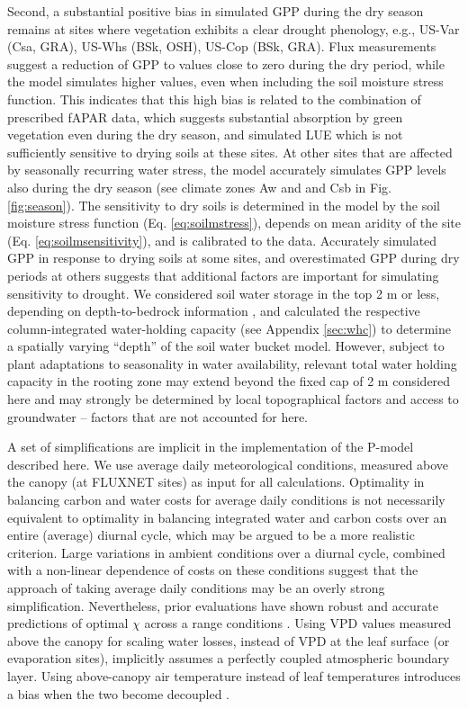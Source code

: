 \documentclass{myreport}
\begin{document}
Second, a substantial positive bias in simulated GPP during the dry season remains at sites where vegetation exhibits a clear drought phenology, e.g., US-Var (Csa, GRA), US-Whs (BSk, OSH), US-Cop (BSk, GRA). Flux measurements suggest a reduction of GPP to values close to zero during the dry period, while the model simulates higher values, even when including the soil moisture stress function. This indicates that this high bias is related to the combination of prescribed fAPAR data, which suggests substantial absorption by green vegetation even during the dry season, and simulated LUE which is not sufficiently sensitive to drying soils at these sites. At other sites that are affected by seasonally recurring water stress, the model accurately simulates GPP levels also during the dry season (see climate zones Aw and and Csb in Fig. \ref{fig:season}). The sensitivity to dry soils is determined in the model by the soil moisture stress function (Eq. \ref{eq:soilmstress}), depends on mean aridity of the site (Eq. \ref{eq:soilmsensitivity}), and is calibrated to the data. Accurately simulated GPP in response to drying soils at some sites, and overestimated GPP during dry periods at others suggests that additional factors are important for simulating sensitivity to drought. We considered soil water storage in the top 2 m or less, depending on depth-to-bedrock information \citep{Hengl2014-jm}, and calculated the respective column-integrated water-holding capacity (see Appendix \ref{sec:whc}) to determine a spatially varying ``depth'' of the soil water bucket model. However, subject to plant adaptations to seasonality in water availability, relevant total water holding capacity in the rooting zone may extend beyond the fixed cap of 2 m considered here \citep{yang16wrr} and may strongly be determined by local topographical factors and access to groundwater \citep{fan13sci, fan17pnas} -- factors that are not accounted for here.

A set of simplifications are implicit in the implementation of the P-model described here. We use average daily meteorological conditions, measured above the canopy (at FLUXNET sites) as input for all calculations. Optimality in balancing carbon and water costs for average daily conditions is not necessarily equivalent to optimality in balancing integrated water and carbon costs over an entire (average) diurnal cycle, which may be argued to be a more realistic criterion. Large variations in ambient conditions over a diurnal cycle, combined with a non-linear dependence of costs on these conditions suggest that the approach of taking average daily conditions may be an overly strong simplification. Nevertheless, prior evaluations have shown robust and accurate predictions of optimal $\chi$ across a range conditions \citep{wang17natpl}. Using VPD values measured above the canopy for scaling water losses, instead of VPD at the leaf surface (or evaporation sites), implicitly assumes a perfectly coupled atmospheric boundary layer. Using above-canopy air temperature instead of leaf temperatures introduces a bias when the two become decoupled \citep{michaletz15tee}. %
\end{document}
